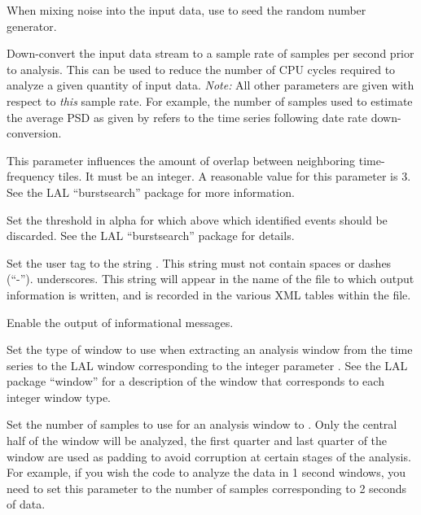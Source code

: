 \begin{entry}
\begin{entry}
\item[\option{--seed} \parm{seed}]
When mixing noise into the input data, use  to seed the random
number generator.

\item[\option{--target-sample-rate} \parm{Hz}]
Down-convert the input data stream to a sample rate of  samples
per second prior to analysis.  This can be used to reduce the number of CPU
cycles required to analyze a given quantity of input data.  \emph{Note:}
All other parameters are given with respect to \emph{this} sample rate.
For example, the number of samples used to estimate the average PSD as
given by  refers to the time series following
date rate down-conversion.

\item[\option{--tile-overlap-factor} \parm{factor}]
This parameter influences the amount of overlap between neighboring
time-frequency tiles.  It must be an integer.  A reasonable value for this
parameter is 3.  See the LAL ``burstsearch'' package for more information.

\item[\option{--threshold} \parm{threshold}]
Set the threshold in alpha for which above which identified events should
be discarded.  See the LAL ``burstsearch'' package for details.

\item[\option{--user-tag} \parm{comment}]
Set the user tag to the string .  This string must not
contain spaces or dashes (``-'').  underscores.  This string will appear in
the name of the file to which output information is written, and is
recorded in the various XML tables within the file.

\item[\option{--verbose}]
Enable the output of informational messages.

\item[\option{--window} \parm{window}]
Set the type of window to use when extracting an analysis window from the
time series to the LAL window corresponding to the integer parameter
.  See the LAL package ``window'' for a description of the
window that corresponds to each integer window type.

\item[\option{--window-length} \parm{samples}]
Set the number of samples to use for an analysis window to .
Only the central half of the window will be analyzed, the first quarter and
last quarter of the window are used as padding to avoid corruption at
certain stages of the analysis.  For example, if you wish the code to
analyze the data in 1 second windows, you need to set this parameter to the
number of samples corresponding to 2 seconds of data.


\end{entry}
\end{entry}
